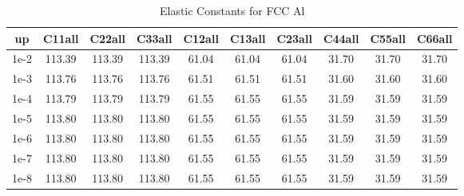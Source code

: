 \begin{table}[h!]
\centering
\begin{tabular}{|c|c|c|c|c|c|c|c|c|c|}
\hline
up &C11all & C22all & C33all & C12all & C13all & C23all & C44all & C55all & C66all \\
\hline
1e-2 & 113.39 & 113.39 & 113.39 & 61.04 & 61.04 & 61.04 & 31.70 & 31.70 & 31.70 \\
\hline
1e-3 & 113.76 & 113.76 & 113.76 & 61.51 & 61.51 & 61.51 & 31.60 & 31.60 & 31.60 \\
\hline
1e-4 & 113.79 & 113.79 & 113.79 & 61.55 & 61.55 & 61.55 & 31.59 & 31.59 & 31.59 \\
\hline
1e-5 & 113.80 & 113.80 & 113.80 & 61.55 & 61.55 & 61.55 & 31.59 & 31.59 & 31.59 \\
\hline
1e-6 & 113.80 & 113.80 & 113.80 & 61.55 & 61.55 & 61.55 & 31.59 & 31.59 & 31.59 \\
\hline
1e-7 & 113.80 & 113.80 & 113.80 & 61.55 & 61.55 & 61.55 & 31.59 & 31.59 & 31.59 \\
\hline
1e-8 & 113.80 & 113.80 & 113.80 & 61.55 & 61.55 & 61.55 & 31.59 & 31.59 & 31.59 \\
\hline
\end{tabular}
\caption{Elastic Constants for FCC Al}
\label{tab:elastic_constants}
\end{table}
